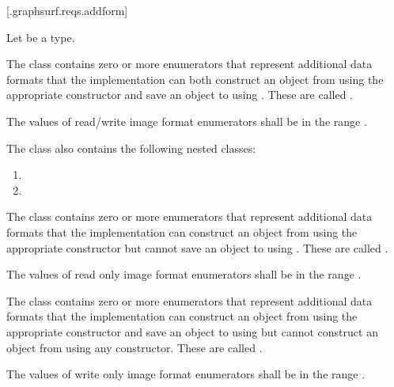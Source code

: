  [\iotwod.graphsurf.reqs.addform]{}

\pnum
Let  be a \graphicssurfacestemplparam type.

\pnum
The  class contains zero or more  enumerators that represent  additional data formats that the implementation can both construct an  object from using the appropriate constructor and save an  object to using . These are called .

\pnum
The values of read/write image format enumerators shall be in the range .

\pnum
The  class also contains the following nested classes:

\begin{enumerate}
\item {}
\item {}
\end{enumerate}

\pnum
The  class contains zero or more  enumerators that represent  additional data formats that the implementation can construct an  object from using the appropriate constructor but cannot save an  object to using . These are called .

\pnum
The values of read only image format enumerators shall be in the range .

\pnum
The  class contains zero or more  enumerators that represent  additional data formats that the implementation can construct an  object from using the appropriate constructor and save an  object to using  but cannot construct an  object from using any constructor. These are called .

\pnum
The values of write only image format enumerators shall be in the range .

